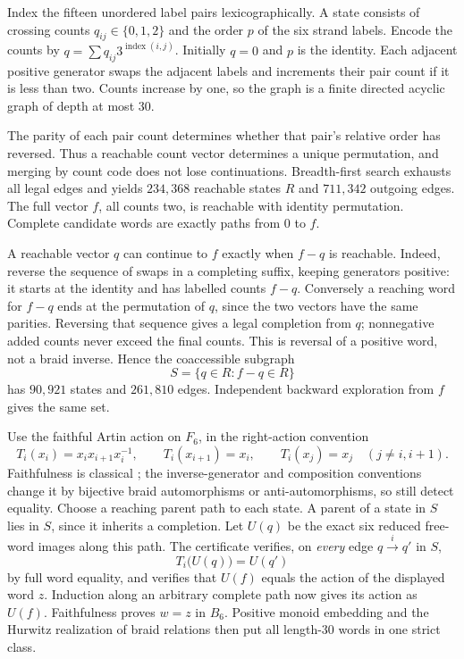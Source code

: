 \documentclass[11pt]{article}
\newcommand{\B}{B_6}
\begin{document}
Index the fifteen unordered label pairs lexicographically.
A state consists of crossing counts \(q_{ij}\in\{0,1,2\}\)
and the order \(p\) of the six strand labels.
Encode the counts by \(q=\sum q_{ij}3^{\operatorname{index}(i,j)}\).
Initially \(q=0\) and \(p\) is the identity.
Each adjacent positive generator swaps the adjacent labels and
increments their pair count if it is less than two.
Counts increase by one, so the graph is a finite directed acyclic
graph of depth at most \(30\).

The parity of each pair count determines whether that pair's
relative order has reversed. Thus a reachable count vector
determines a unique permutation, and merging by count code
does not lose continuations. Breadth-first search exhausts
all legal edges and yields \(234{,}368\) reachable states \(R\)
and \(711{,}342\) outgoing edges.
The full vector \(f\), all counts two, is reachable with identity
permutation. Complete candidate words are exactly paths from \(0\)
to \(f\).

A reachable vector \(q\) can continue to \(f\) exactly when
\(f-q\) is reachable. Indeed, reverse the sequence of swaps in
a completing suffix, keeping generators positive: it starts at
the identity and has labelled counts \(f-q\).
Conversely a reaching word for \(f-q\) ends at the permutation
of \(q\), since the two vectors have the same parities.
Reversing that sequence gives a legal completion from \(q\);
nonnegative added counts never exceed the final counts.
This is reversal of a positive word, not a braid inverse.
Hence the coaccessible subgraph
\[
 S=\{q\in R:f-q\in R\}
\]
has \(90{,}921\) states and \(261{,}810\) edges.
Independent backward exploration from \(f\) gives the same set.

Use the faithful Artin action on \(F_6\), in the right-action convention
\[
 T_i(x_i)=x_i x_{i+1}x_i^{-1},\qquad
 T_i(x_{i+1})=x_i,\qquad T_i(x_j)=x_j\quad(j\ne i,i+1).
\]
Faithfulness is classical \cite[Section 1.6]{GM}; the inverse-generator
and composition conventions change it by bijective braid
automorphisms or anti-automorphisms, so still detect equality.
Choose a reaching parent path to each state. A parent of a state
in \(S\) lies in \(S\), since it inherits a completion.
Let \(U(q)\) be the exact six reduced free-word images along this
path. The certificate verifies, on \emph{every} edge
\(q\xrightarrow{i}q'\) in \(S\),
\begin{equation}\label{edge}
 T_i\bigl(U(q)\bigr)=U(q')
\end{equation}
by full word equality, and verifies that \(U(f)\) equals the
action of the displayed word \(z\).
Induction along an arbitrary complete path now gives its action
as \(U(f)\). Faithfulness proves \(w=z\) in \(\B\).
Positive monoid embedding and the Hurwitz realization of braid
relations then put all length-\(30\) words in one strict class.
\end{document}
